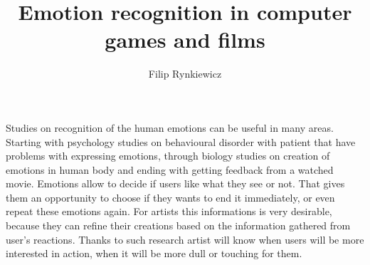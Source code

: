 \documentclass[10pt,journal,compsoc,twoside]{IEEEtran}
\begin{document}
\title{Emotion recognition in computer games and films}

\author{Filip Rynkiewicz%
}


%
{}


\maketitle
\IEEEdisplaynontitleabstractindextext
\IEEEpeerreviewmaketitle
{}
Studies on recognition of the human emotions can be useful in many areas. Starting with psychology studies on behavioural disorder with patient that have problems with expressing emotions, through biology studies on creation of emotions in human body and ending with getting feedback from a watched movie. Emotions allow to decide if users like what they see or not. That gives them an opportunity to choose if they wants to end it immediately, or even repeat these emotions again. For artists this informations is very desirable, because they can refine their creations based on the information gathered from user's reactions. Thanks to such research artist will know when users will be more interested in action, when it will be more dull or touching for them. 
\end{document}
